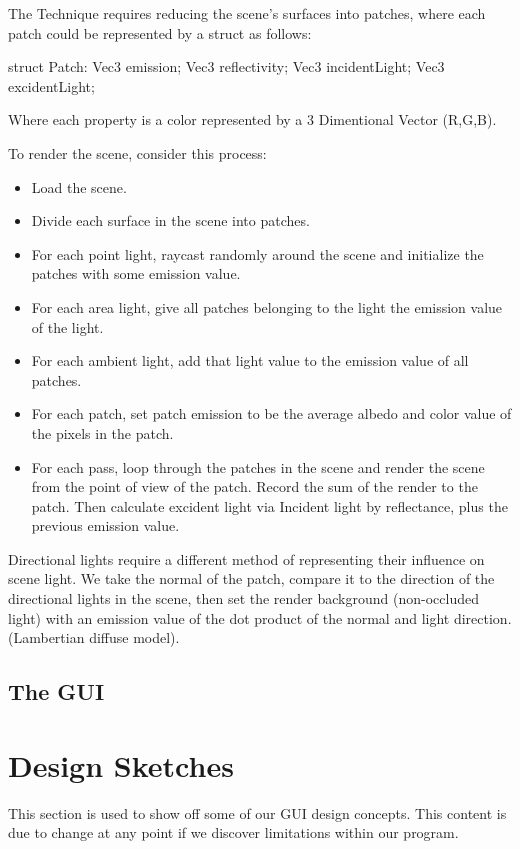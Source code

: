 \documentclass{report}
\begin{document}
The Technique requires reducing the scene's surfaces into patches, where each patch could
be represented by a struct as follows:

\begin{verbratim}
struct Patch:
  Vec3 emission;
  Vec3 reflectivity;
  Vec3 incidentLight;
  Vec3 excidentLight;
\end{verbratim}

Where each property is a color represented by a 3 Dimentional Vector (R,G,B).

To render the scene, consider this process:

\begin{itemize}
\item Load the scene.
\item Divide each surface in the scene into patches.
\item For each point light, raycast randomly around the scene and initialize the
  patches with some emission value.
\item For each area light, give all patches belonging to the light the emission
  value of the light.
\item For each ambient light, add that light value to the emission value of all
  patches.
\item For each patch, set patch emission to be the average albedo and color value of the pixels in the patch.
\item For each pass, loop through the patches in the scene and render the scene from the point of view of the patch. Record the sum of the render to the patch. Then calculate excident light via Incident light by reflectance, plus the previous emission value.
\end{itemize}

Directional lights require a different method of representing their influence on
scene light. We take the normal of the patch, compare it to the direction of the
directional lights in the scene, then set the render background (non-occluded
light) with an emission value of the dot product of the normal and light
direction. (Lambertian diffuse model).

\section{The GUI}

\chapter{Design Sketches}
This section is used to show off some of our GUI design concepts. This content
is due to change at any point if we discover limitations within our program.
\end{document}
